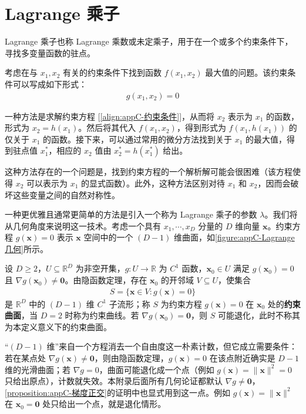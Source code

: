\documentclass[../main.tex]{subfiles}
\begin{document}

\chapter{Lagrange 乘子}\label{chapter:appC-Lagrange乘子}

Lagrange 乘子也称 Lagrange 乘数或未定乘子，用于在一个或多个约束条件下，寻找多变量函数的驻点。

考虑在与 $x_1,x_2$ 有关的约束条件下找到函数 $f(x_1,x_2)$ 最大值的问题。该约束条件可以写成如下形式：
\begin{align}
  g(x_1,x_2)=0
  \label{align:appC-约束条件}
\end{align}

一种方法是求解约束方程 [\eqref{align:appC-约束条件}]，从而将 $x_2$ 表示为 $x_1$ 的函数，形式为 $x_2=h(x_1)$。然后将其代入 $f(x_1,x_2)$，得到形式为 $f(x_1,h(x_1))$ 的仅关于 $x_1$ 的函数。接下来，可以通过常用的微分方法找到关于 $x_1$ 的最大值，得到驻点值 $x_1^{*}$，相应的 $x_2$ 值由 $x_2^{*}=h(x_1^{*})$ 给出。

这种方法存在的一个问题是，找到约束方程的一个解析解可能会很困难（该方程使得 $x_2$ 可以表示为 $x_1$ 的显式函数）。此外，这种方法区别对待 $x_1$ 和 $x_2$，因而会破坏这些变量之间的自然对称性。

一种更优雅且通常更简单的方法是引入一个称为 Lagrange 乘子的参数 $\lambda$。我们将从几何角度来说明这一技术。考虑一个具有 $x_1,\cdots,x_D$ 分量的 $D$ 维向量 $\bm{x}$。约束方程 $g(\bm{x})=0$ 表示 $\bm{x}$ 空间中的一个 $(D-1)$ 维曲面，如\cref{figure:appC-Lagrange几何}所示。

\begin{definition}[约束曲面]\label{definition:appC-约束曲面}
设 $D\geqslant2$，$U\subseteq\mathbb{R}^{D}$ 为非空开集，$g:U\to\mathbb{R}$ 为 $C^{1}$ 函数，$\bm{x}_{0}\in U$ 满足 $g(\bm{x}_{0})=0$ 且 $\nabla g(\bm{x}_{0})\neq\bm{0}$。由隐函数定理，存在 $\bm{x}_{0}$ 的开邻域 $V\subseteq U$，使集合
\begin{align*}
  S=\{\bm{x}\in V:g(\bm{x})=0\}
\end{align*}
是 $\mathbb{R}^{D}$ 中的 $(D-1)$ 维 $C^{1}$ 子流形；称 $S$ 为约束方程 $g(\bm{x})=0$ 在 $\bm{x}_{0}$ 处的\textbf{约束曲面}，当 $D=2$ 时称为约束曲线。若 $\nabla g(\bm{x}_{0})=\bm{0}$，则 $S$ 可能退化，此时不称其为本定义意义下的约束曲面。
\end{definition}

\begin{remark}
“$(D-1)$ 维”来自一个方程消去一个自由度这一朴素计数，但它成立需要条件：若在某点处 $\nabla g(\bm{x})\neq\bm{0}$，则由隐函数定理，$g(\bm{x})=0$ 在该点附近确实是 $D-1$ 维的光滑曲面；若 $\nabla g=0$，曲面可能退化成一个点（例如 $g(\bm{x})=\|\bm{x}\|^{2}=0$ 只给出原点），计数就失效。本附录后面所有几何论证都默认 $\nabla g\neq\bm{0}$，\cref{proposition:appC-梯度正交}的证明中也显式用到这一点。例如 $g(\bm{x})=\|\bm{x}\|^{2}$ 在 $\bm{x}_{0}=\bm{0}$ 处只给出一个点，就是退化情形。
\end{remark}
\end{document}
